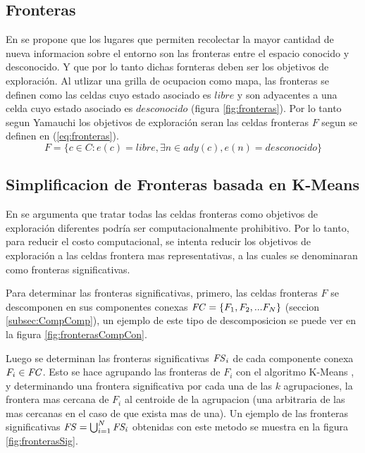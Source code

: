 \subsection{Fronteras}
En \cite{yamauchi1998frontier} se propone que los lugares que permiten
recolectar la mayor cantidad de nueva informacion sobre el entorno son las
fronteras entre el espacio conocido y desconocido. Y que por lo tanto dichas
fornteras deben ser los objetivos de exploración.
Al utlizar una grilla de ocupacion como mapa, las fronteras se definen como las
celdas cuyo estado asociado es $libre$ y son adyacentes a una celda cuyo estado
asociado es $desconocido$ (figura \ref{fig:fronteras}).
Por lo tanto segun Yamauchi los objetivos de exploración seran las celdas
fronteras $F$ segun se definen en (\ref{eq:fronteras}).
\begin{equation} 
  F = \{ c \in C : e(c) = libre, \exists n \in ady(c), e(n) = desconocido  \}
  \label{eq:fronteras}
\end{equation}

\subsection{Simplificacion de Fronteras basada en K-Means}
En \cite{amorin2019novel} se argumenta que tratar todas las celdas fronteras
como objetivos de exploración diferentes podría ser computacionalmente
prohibitivo. Por lo tanto, para reducir el costo computacional, se intenta
reducir los objetivos de exploración a las celdas frontera mas representativas,
a las cuales se denominaran como fronteras significativas.

Para determinar las fronteras significativas, primero, las celdas fronteras $F$
se descomponen en sus componentes conexas $\mathit{FC}=\{F_1,F_2,...F_N\}$
(seccion \ref{subsec:CompComp}), un ejemplo de este tipo de descomposicion se
puede ver en la figura \ref{fig:fronterasCompCon}.

Luego se determinan las fronteras significativas $\mathit{FS}_i$ de cada
componente conexa $F_i\in \mathit{FC}$. Esto se hace agrupando las fronteras de
$F_i$ con el algoritmo K-Means \cite{macqueen1967some}, y determinando una
frontera significativa por cada una de las $k$ agrupaciones, la
frontera mas cercana de $F_i$ al centroide de la agrupacion (una arbitraria de
las mas cercanas en el caso de que exista mas de una). Un ejemplo de las
fronteras significativas  $\mathit{FS} = \bigcup_{i=1}^N \mathit{FS_i}$ obtenidas con
este metodo se muestra en la figura \ref{fig:fronterasSig}.

